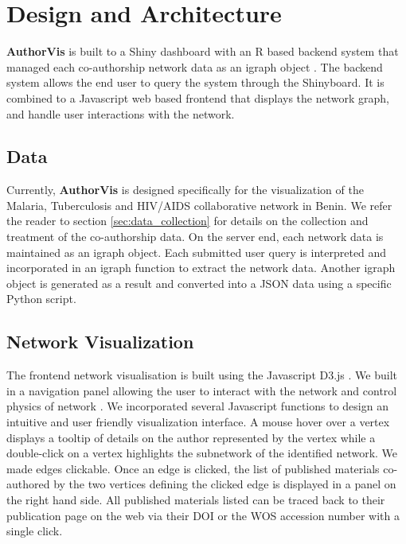 \section{Design and Architecture}
\textbf{AuthorVis} is built to a Shiny dashboard with an R based backend system that managed each co-authorship network data as an igraph object \cite{csardi_igraph_2006}. The backend system allows the end user to query the system through the Shinyboard. It is combined to a Javascript web based frontend that displays the network graph, and handle user interactions with the network.

\subsection{Data}
Currently, \textbf{AuthorVis} is designed specifically for the visualization of the Malaria, Tuberculosis and HIV/AIDS collaborative network in Benin. We refer the reader to section \ref{sec:data_collection} for details on the collection and treatment of the co-authorship data. On the server end, each network data is maintained as an igraph object. Each submitted user query is interpreted and incorporated in an igraph function to extract the network data. Another igraph object is generated as a result and converted into a JSON data using a specific Python script.

\subsection{Network Visualization}
The frontend network visualisation is built using the Javascript D3.js \cite{bostock_d3._2012}. We built in a navigation panel allowing the user to interact with the network and control physics of network \cite{newman_physics_2008}. We incorporated several Javascript functions to design an intuitive and user friendly visualization interface. A mouse hover over a vertex displays a tooltip of details on the author represented by the vertex while a double-click on a vertex highlights the subnetwork of the identified network. We made edges clickable. Once an edge is clicked, the list of published materials co-authored by the two vertices defining the clicked edge is displayed in a panel on the right hand side. All published materials listed can be traced back to their publication page on the web via their DOI or the WOS accession number with a single click.


